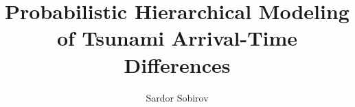 \documentclass[preprint]{vgtc}
\title{Probabilistic Hierarchical Modeling of Tsunami Arrival-Time Differences}
\author{Sardor Sobirov}
\affiliation{\normalsize
Independent researcher\\[0.4em]
Category: Research\\[0.4em]
Code and data: \href{https://github.com/sardorsob/PacificVis-Tsunami-Warning}{\underline{GitHub repository}}}
\begin{document}
\frenchspacing
\raggedbottom
\maketitle

\raggedbottom
\begingroup
\raggedright


\endgroup
\end{document}
